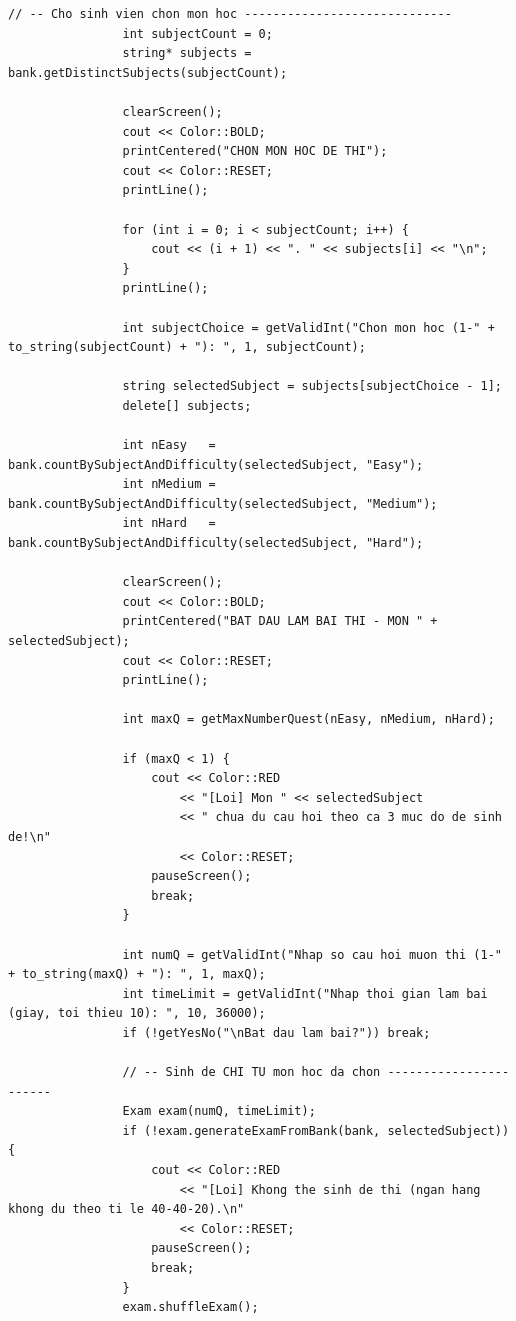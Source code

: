 \documentclass[11pt]{report}
\begin{document}
\begin{lstlisting}[caption={Menu.cpp -- Cài đặt giao diện Menu và điều hướng}, label={lst:full_menu_cpp}]
                // -- Cho sinh vien chon mon hoc -----------------------------
                int subjectCount = 0;
                string* subjects = bank.getDistinctSubjects(subjectCount);

                clearScreen();
                cout << Color::BOLD;
                printCentered("CHON MON HOC DE THI");
                cout << Color::RESET;
                printLine();

                for (int i = 0; i < subjectCount; i++) {
                    cout << (i + 1) << ". " << subjects[i] << "\n";
                }
                printLine();

                int subjectChoice = getValidInt("Chon mon hoc (1-" + to_string(subjectCount) + "): ", 1, subjectCount);

                string selectedSubject = subjects[subjectChoice - 1];
                delete[] subjects;

                int nEasy   = bank.countBySubjectAndDifficulty(selectedSubject, "Easy");
                int nMedium = bank.countBySubjectAndDifficulty(selectedSubject, "Medium");
                int nHard   = bank.countBySubjectAndDifficulty(selectedSubject, "Hard");

                clearScreen();
                cout << Color::BOLD;
                printCentered("BAT DAU LAM BAI THI - MON " + selectedSubject);
                cout << Color::RESET;
                printLine();

                int maxQ = getMaxNumberQuest(nEasy, nMedium, nHard);

                if (maxQ < 1) {
                    cout << Color::RED
                        << "[Loi] Mon " << selectedSubject
                        << " chua du cau hoi theo ca 3 muc do de sinh de!\n"
                        << Color::RESET;
                    pauseScreen();
                    break;
                }

                int numQ = getValidInt("Nhap so cau hoi muon thi (1-" + to_string(maxQ) + "): ", 1, maxQ);
                int timeLimit = getValidInt("Nhap thoi gian lam bai (giay, toi thieu 10): ", 10, 36000);
                if (!getYesNo("\nBat dau lam bai?")) break;

                // -- Sinh de CHI TU mon hoc da chon -----------------------
                Exam exam(numQ, timeLimit);
                if (!exam.generateExamFromBank(bank, selectedSubject)) {
                    cout << Color::RED
                        << "[Loi] Khong the sinh de thi (ngan hang khong du theo ti le 40-40-20).\n"
                        << Color::RESET;
                    pauseScreen();
                    break;
                }
                exam.shuffleExam();


\end{lstlisting}
\end{document}
